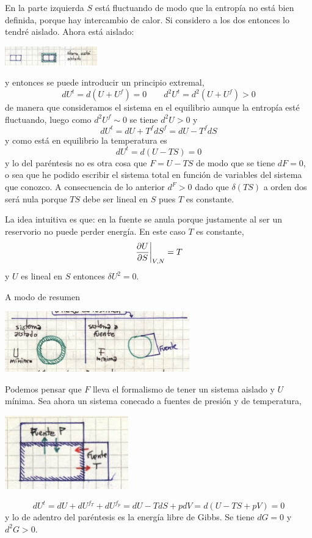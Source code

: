 \documentclass[10pt,oneside]{CBFT_book}
\begin{document}
En la parte izquierda $S$ está fluctuando de modo que la entropía no está bien
definida, porque hay intercambio de calor. Si considero a los dos entonces lo
tendré aislado.
Ahora está aislado: 

\includegraphics[width=0.30\textwidth]{images/1606329087.jpg}

y entonces se puede introducir un principio extremal,
\[
	dU^t = d(U+U^f) = 0 \qquad 
	d^2 U^t = d^2(U + U^f) > 0
\]
de manera que consideramos el sistema en el equilibrio aunque la entropía esté
fluctuando, luego como $d^2U^f \sim 0$ se tiene $d^2U > 0$ y
\[
	dU^t = dU + T^f dS^f = dU - T^f dS
\]
y como está en equilibrio la temperatura es
\[
	dU^t = d(U-TS)= 0 
\]
y lo del paréntesis no es otra cosa que $F=U-TS$ de modo que se tiene $dF=0$,
o sea que he podido escribir el sistema total en función de variables del 
sistema que conozco.
A consecuencia de lo anterior $d^F >0$ dado que $\delta(TS)$ a orden dos será 
nula porque $TS$ debe ser lineal en $S$ pues $T$ es constante.

La idea intuitiva es que: en la fuente se anula porque justamente al ser un
reservorio no puede perder energía. En este caso $T$ es constante,
\[
	\left.\frac{\partial^{\hspace{-0.05em}} {U}}{\partial {S}^{\hspace{-0.05em}}}\right|_{V,N} = T
\]
y $U$ es lineal en $S$ entonces $\delta U^2= 0$.

A modo de resumen 

\includegraphics[width=0.60\textwidth]{images/1606329091.jpg}

Podemos pensar que $F$ lleva el formalismo de tener un sistema aislado y $U$
mínima.
Sea ahora un sistema conecado a fuentes de presión y de temperatura,

\includegraphics[width=0.40\textwidth]{images/1606329098.jpg}

\[
	dU^t = dU + dU^{f_T} + dU^{f_p} =
	dU - TdS + pdV = d( U - TS + pV ) = 0
\] 
y lo de adentro del paréntesis es la energía libre de Gibbs. Se tiene $dG=0$ y
$d^2G > 0$.
\end{document}
